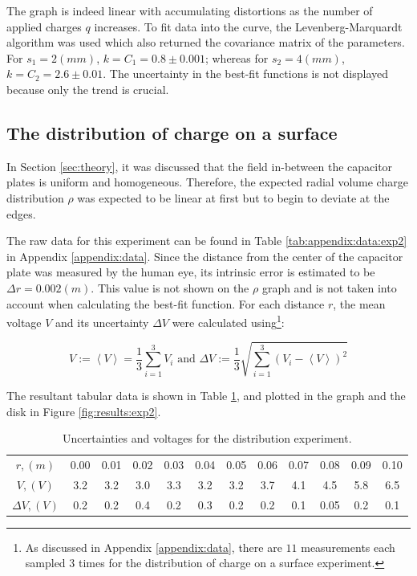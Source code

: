 The graph is indeed linear with accumulating distortions as the number of applied charges $q$ increases. To fit data into the curve, the Levenberg-Marquardt algorithm \cite{scipy} was used which also returned the covariance matrix of the parameters. For $s_1 = 2(mm)$, $k = C_1 = 0.8 \pm 0.001$; whereas for $s_2 = 4(mm)$, $k = C_2 = 2.6 \pm 0.01$. The uncertainty in the best-fit functions is not displayed because only the trend is crucial.

\subsection{The distribution of charge on a surface} \label{sec:results:exp2}

In Section \ref{sec:theory}, it was discussed that the field in-between the capacitor plates is uniform and homogeneous. Therefore, the expected radial volume charge distribution $\rho$ was expected to be linear at first but to begin to deviate at the edges.

The raw data for this experiment can be found in Table \ref{tab:appendix:data:exp2} in Appendix \ref{appendix:data}. Since the distance from the center of the capacitor plate was measured by the human eye, its intrinsic error is estimated to be $\Delta r = 0.002 (m)$. This value is not shown on the $\rho$ graph and is not taken into account when calculating the best-fit function. For each distance $r$, the mean voltage $V$ and its uncertainty $\Delta V$ were calculated using\footnote{As discussed in Appendix \ref{appendix:data}, there are $11$ measurements each sampled $3$ times for the distribution of charge on a surface experiment.}:

\begin{equation*}
    V := \left< V \right> = \frac{1}{3}\sum_{i=1}^{3} V_i \text{  and  } \Delta V := \frac{1}{3}\sqrt{ \sum_{i=1}^{3} (V_i - \left< V \right> )^2 }
\end{equation*}

The resultant tabular data is shown in Table \ref{tab:results:exp2}, and plotted in the graph and the disk in Figure \ref{fig:results:exp2}.

\begin{table}[H]
    \centering
    \begin{tabular}{|c|ccccccccccc|}
        \hline
         $r, (m)$        & 0.00 & 0.01 & 0.02 & 0.03 & 0.04 & 0.05 & 0.06 & 0.07 & 0.08 & 0.09 & 0.10 \\
         $V, (V)$        & 3.2 & 3.2 & 3.0 & 3.3 & 3.2 & 3.2 & 3.7 & 4.1 & 4.5 & 5.8 & 6.5 \\
         $\Delta V, (V)$ & 0.2 & 0.2 & 0.4 & 0.2 & 0.3 & 0.2 & 0.2 & 0.1 & 0.05 & 0.2 & 0.1 \\
         \hline
    \end{tabular}
    \caption{Uncertainties and voltages for the distribution experiment.}
    \label{tab:results:exp2}
\end{table}

